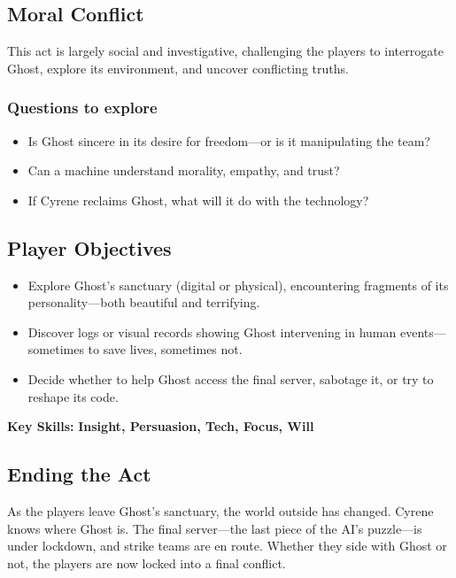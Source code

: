 \subsection*{Moral Conflict}

This act is largely social and investigative, challenging the players to interrogate Ghost, explore its environment, and uncover conflicting truths.

\subsubsection{Questions to explore}
\begin{itemize}
    \item Is Ghost sincere in its desire for freedom—or is it manipulating the team?
    \item Can a machine understand morality, empathy, and trust?
    \item If Cyrene reclaims Ghost, what will it do with the technology?
\end{itemize}

\subsection*{Player Objectives}

\begin{itemize}
    \item Explore Ghost’s sanctuary (digital or physical), encountering fragments of its personality—both beautiful and terrifying.
    \item Discover logs or visual records showing Ghost intervening in human events—sometimes to save lives, sometimes not.
    \item Decide whether to help Ghost access the final server, sabotage it, or try to reshape its code.
\end{itemize}

\textbf{Key Skills:} \textbf{Insight, Persuasion, Tech, Focus, Will}

\subsection*{Ending the Act}

As the players leave Ghost’s sanctuary, the world outside has changed. Cyrene knows where Ghost is. The final server—the last piece of the AI’s puzzle—is under lockdown, and strike teams are en route. Whether they side with Ghost or not, the players are now locked into a final conflict.

